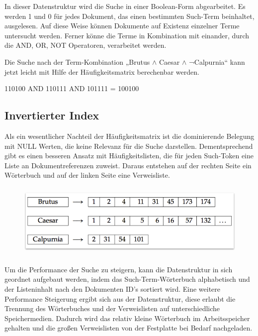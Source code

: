In dieser Datenstruktur wird die Suche in einer Boolean-Form
abgearbeitet. Es werden {\textquotedbl}1{\textquotedbl} und
{\textquotedbl}0{\textquotedbl} für jedes Dokument, das einen
bestimmten Such-Term beinhaltet, ausgelesen. Auf diese Weise können
Dokumente auf Existenz einzelner Terme untersucht werden. Ferner könne
die Terme in Kombination mit einander, durch die AND, OR, NOT
Operatoren, verarbeitet werden.




Die Suche nach der Term-Kombination „Brutus ${\wedge}$ Caesar ${\wedge}$
¬Calpurnia“ kann jetzt leicht mit Hilfe der Häufigkeitsmatrix
berechenbar werden. 




110100 AND 110111 AND 101111 = 100100




\subsection[Invertierter Index]{Invertierter Index}



Als ein wesentlicher Nachteil der Häufigkeitsmatrix ist die dominierende
Belegung mit NULL Werten, die keine Relevanz für die Suche darstellen.
Dementsprechend gibt es einen besseren Ansatz mit Häufigkeitslisten,
die für jeden Such-Token eine Liste an Dokumentreferenzen zuweist.
Daraus entstehen auf der rechten Seite ein Wörterbuch und auf der
linken Seite eine Verweisliste. 

\begin{figure}
\centering
\includegraphics[width=13.143cm,height=3.634cm]{bilder/SeminararbeitArkadij-img2.png}
\end{figure}



Um die Performance der Suche zu steigern, kann die Datenstruktur in sich
geordnet aufgebaut werden, indem das Such-Term-Wörterbuch alphabetisch
und der Listeninhalt nach den Dokumenten ID’s sortiert wird. Eine
weitere Performance Steigerung ergibt sich aus der Datenstruktur, diese
erlaubt die Trennung des Wörterbuches und der Verweislisten auf
unterschiedliche Speichermedien. Dadurch wird das relativ kleine
Wörterbuch im Arbeitsspeicher gehalten und die großen Verweislisten von
der Festplatte bei Bedarf nachgeladen.




